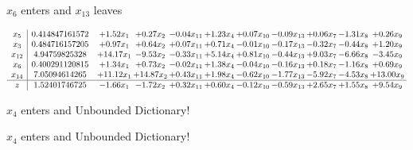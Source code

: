 \documentclass[9pt]{article}
\begin{document}
 $ x_{6} $ enters and $ x_{13} $ leaves 

 \[\begin{array}{c| c c@{\hskip 2pt} c@{\hskip 2pt} c@{\hskip 2pt} c@{\hskip 2pt} c@{\hskip 2pt} c@{\hskip 2pt} c@{\hskip 2pt} c@{\hskip 2pt} c@{\hskip 2pt} }
 x_{5}   &  0.414847161572 & +  1.52 x_{1} & +  0.27 x_{2} & -0.04 x_{11} & +  1.23 x_{4} & +  0.07 x_{10} & -0.09 x_{13} & +  0.06 x_{7} & -1.31 x_{8} & +  0.26 x_{9}\\
 x_{3}   &  0.484716157205 & +  0.97 x_{1} & +  0.64 x_{2} & +  0.07 x_{11} & +  0.71 x_{4} & -0.01 x_{10} & -0.17 x_{13} & -0.32 x_{7} & -0.44 x_{8} & +  1.20 x_{9}\\
 x_{12}   &  4.94759825328 & + 14.17 x_{1} & -9.53 x_{2} & -0.33 x_{11} & +  5.14 x_{4} & +  0.81 x_{10} & -0.44 x_{13} & +  9.03 x_{7} & -6.66 x_{8} & -3.45 x_{9}\\
 x_{6}   &  0.400291120815 & +  1.34 x_{1} & +  0.73 x_{2} & -0.02 x_{11} & +  1.38 x_{4} & -0.04 x_{10} & -0.16 x_{13} & +  0.18 x_{7} & -1.16 x_{8} & +  0.69 x_{9}\\
 x_{14}   &  7.05094614265 & + 11.12 x_{1} & + 14.87 x_{2} & +  0.43 x_{11} & +  1.98 x_{4} & -0.62 x_{10} & -1.77 x_{13} & -5.92 x_{7} & -4.53 x_{8} & + 13.00 x_{9}\\
\hline
z    &  1.52401746725 & -1.66 x_{1} & -1.72 x_{2} & +  0.32 x_{11} & +  0.60 x_{4} & -0.12 x_{10} & -0.59 x_{13} & +  2.65 x_{7} & +  1.55 x_{8} & +  9.54 x_{9}\\
\end{array}\]


 $ x_{4} $ enters and Unbounded Dictionary!


 $ x_{4} $ enters and Unbounded Dictionary!
\end{document}
